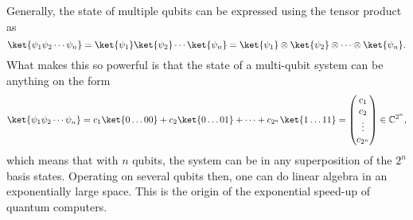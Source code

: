 Generally, the state of multiple qubits can be expressed using the tensor product as
\begin{equation}
    \ket{\psi_1 \psi_2 \cdots  \psi_n}
    = \ket{\psi_1} \ket{\psi_2} \cdots \ket{\psi_n}
    = \ket{\psi_1} \otimes \ket{\psi_2} \otimes \cdots \otimes \ket{\psi_n}
    \label{eq:tensor}.
\end{equation}
What makes this so powerful is that the state of a multi-qubit system can be anything on the form
\begin{equation}
    \ket{\psi_1 \psi_2 \cdots  \psi_n}
    = c_1 \ket{0\dots 00} + c_2 \ket{0\dots 01} + \cdots + c_{2^n} \ket{1\dots 11}
    = \begin{pmatrix}
        c_1 \\ c_2 \\ \vdots \\ c_{2^n}
    \end{pmatrix}
    \in \mathbb{C}^{2^n},
    \label{eq:superposition}
\end{equation}
which means that with $n$ qubits, the system can be in any superposition of the $2^n$ basis states.
Operating on several qubits then, one can do linear algebra in an exponentially large space.
This is the origin of the exponential speed-up of quantum computers.